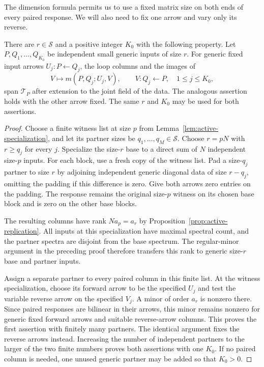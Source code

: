 The dimension formula permits us to use a fixed matrix size on both
ends of every paired response.  We will also need to fix one arrow
and vary only its reverse.

\begin{corollary}
\label{cor:equal-size-partners}
There are $r\in\mathcal S$ and a positive integer $K_0$ with the
following property.  Let $P,Q_1,\ldots,Q_{K_0}$ be independent small
generic inputs of size $r$.  For generic fixed input arrows
$U_j:P\leftarrow Q_j$, the loop columns and the images of
\[
 V\longmapsto m(P,Q_j;U_j,V),
 \qquad V:Q_j\leftarrow P,\quad 1\leq j\leq K_0,
\]
span $\mathcal T_P$ after extension to the joint field of the data.
The analogous assertion holds with the other arrow fixed.  The same
$r$ and $K_0$ may be used for both assertions.
\end{corollary}

\begin{proof}
Choose a finite witness list at size $p$ from
Lemma~\ref{lem:active-specialization}, and let its partner sizes be
$q_1,\ldots,q_M\in\mathcal S$.  Choose $r=pN$ with
$r\geq q_j$ for every $j$.  Specialize the size-$r$ base to a direct
sum of $N$ independent size-$p$ inputs.  For each block, use a fresh
copy of the witness list.  Pad a size-$q_j$ partner to size $r$ by
adjoining independent generic diagonal data of size $r-q_j$, omitting
the padding if this difference is zero.  Give both arrows zero entries
on the padding.  The response remains the original size-$p$ witness
on its chosen base block and is zero on the other base blocks.

The resulting columns have rank $Na_p=a_r$ by
Proposition~\ref{prop:active-replication}.  All inputs at this
specialization have maximal spectral count, and the partner spectra
are disjoint from the base spectrum.  The regular-minor argument in
the preceding proof therefore transfers this rank to generic
size-$r$ base and partner inputs.

Assign a separate partner to every paired column in this finite
list.  At the witness specialization, choose its forward arrow to
be the specified $U_j$ and test the variable reverse arrow on the
specified $V_j$.  A minor of order $a_r$ is nonzero there.  Since
paired responses are bilinear in their arrows, this minor remains
nonzero for generic fixed forward arrows and suitable reverse-arrow
columns.  This proves the first assertion with finitely many partners.
The identical argument fixes the reverse arrows instead.  Increasing
the number of independent partners to the larger of the two finite
numbers proves both assertions with one $K_0$.  If no paired column
is needed, one unused generic partner may be added so that $K_0>0$.
\end{proof}
